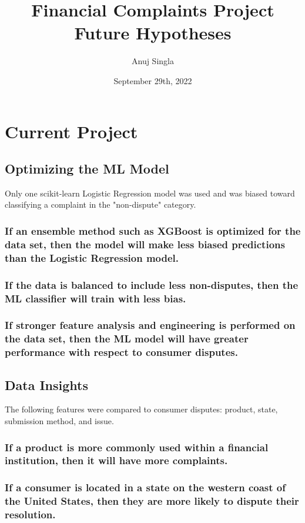 \documentclass{report}
\title{Financial Complaints Project Future Hypotheses}
\author{Anuj Singla}
\date{September 29th, 2022}
\begin{document}
\maketitle

\chapter{Current Project}

\section{Optimizing the ML Model}
Only one scikit-learn Logistic Regression model was used and was biased toward classifying a complaint in the "non-dispute" category.
\subsection{If an ensemble method such as XGBoost is optimized for the data set, then the model will make less biased predictions than the Logistic Regression model.}
\subsection{If the data is balanced to include less non-disputes, then the ML classifier will train with less bias.}
\subsection{If stronger feature analysis and engineering is performed on the data set, then the ML model will have greater performance with respect to consumer disputes.}

\section{Data Insights}
The following features were compared to consumer disputes: product, state, submission method, and issue.
\subsection{If a product is more commonly used within a financial institution, then it will have more complaints.}
\subsection{If a consumer is located in a state on the western coast of the United States, then they are more likely to dispute their resolution.}
\end{document}
